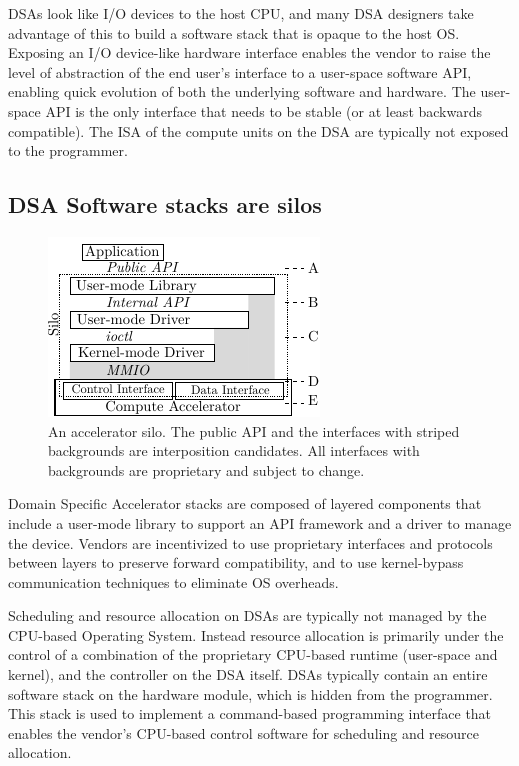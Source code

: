 DSAs look like I/O devices to the host CPU, and many DSA designers take
advantage of this to build a software stack that is opaque to the host OS.
Exposing an I/O device-like hardware interface enables the vendor to raise the
level of abstraction of the end user's interface to a user-space software API,
enabling quick evolution of both the underlying software and hardware. The
user-space API is the only interface that needs to be stable (or at least
backwards compatible). The ISA of the compute units on the DSA are typically
not exposed to the programmer.

\subsection{DSA Software stacks are silos}
\label{section:silos}
\begin{figure}[!h]
	\centering
	\includegraphics[width=.5\linewidth]{figures/silo.pdf}
	\caption{An accelerator silo. The public API and the interfaces with striped backgrounds are interposition candidates. All interfaces with backgrounds are proprietary and subject to change.}
	\label{fig:silo}
\end{figure}

Domain Specific Accelerator stacks are composed of layered components that
include a user-mode library to support an API framework and a driver to manage
the device. Vendors are incentivized to use proprietary interfaces and
protocols between layers to preserve forward compatibility, and to use
kernel-bypass communication techniques to eliminate OS overheads.

Scheduling and resource allocation on DSAs are typically not managed by the
CPU-based Operating System. Instead resource allocation is primarily under the
control of a combination of the proprietary CPU-based runtime (user-space and
kernel), and the controller on the DSA itself. DSAs typically contain an
entire software stack on the hardware module, which is hidden from the
programmer. This stack is used to implement a command-based programming
interface that enables the vendor's CPU-based control software for scheduling
and resource allocation.

